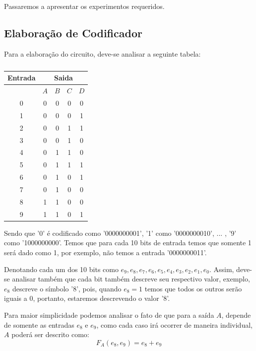 \documentclass[12pt]{article}
\begin{document}
Passaremos a apresentar os experimentos requeridos.

\subsection{Elaboração de Codificador}\label{sec:elaboração_codificador}

Para a elaboração do circuito, deve-se analisar a seguinte tabela:
\begin{table}[H]
    \centering
    \caption{}
    \begin{tabular}{|c|c|c|c|c|}\hline
    \multicolumn{1}{|c|}{Entrada} & \multicolumn{4}{|c|}{Saida} \\\hline
    \textbf{$ $} & \textbf{$A$} & \textbf{$B$} & \textbf{$C$} & \textbf{$D$} \\\hline
    0 & 0 & 0 & 0 & 0 \\\hline
    1 & 0 & 0 & 0 & 1\\\hline
    2 & 0 & 0 & 1 & 1\\\hline
    3 & 0 & 0 & 1 & 0\\\hline
    4 & 0 & 1 & 1 & 0\\\hline
    5 & 0 & 1 & 1 & 1\\\hline
    6 & 0 & 1 & 0 & 1\\\hline
    7 & 0 & 1 & 0 & 0\\\hline
    8 & 1 & 1 & 0 & 0\\\hline
    9 & 1 & 1 & 0 & 1\\\hline
    \end{tabular}\label{tab:comparador_de_palavras_3_bits}
\end{table}

Sendo que '0' é codificado como '0000000001', '1' como '0000000010', ... , '9' como '1000000000'.
Temos que para cada 10 bits de entrada temos que somente 1 será dado como 1, por exemplo, não temos a entrada '0000000011'.

Denotando cada um dos 10 bits como $e_{9},e_{8},e_{7},e_{6},e_{5},e_{4},e_{3},e_{2},e_{1},e_{0}$. Assim, deve-se analisar também que cada bit também descreve seu respectivo valor, exemplo, $e_{8}$ descreve o símbolo '8', pois, quando $e_{8}=1$ temos que todos os outros serão iguais a 0, portanto, estaremos descrevendo o valor '8'.

Para maior simplicidade podemos analisar o fato de que para a saída \textbf{$A$}, depende de somente as entradas $e_{8}$ e $e_{9}$, como cada caso irá ocorrer de maneira individual, \textbf{$A$} poderá ser descrito como:
\begin{equation}
F_{A}(e_{8}, e_{9}) = e_{8} + e_{9}
\end{equation}
\end{document}

